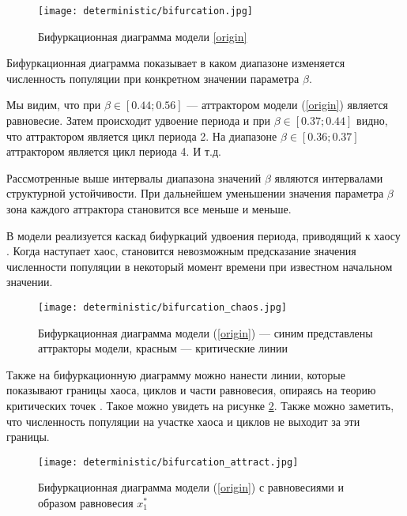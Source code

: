         \begin{figure}
            \centering
            \texttt{[image: deterministic/bifurcation.jpg]}

            \captionsetup{justification=centering}
            \caption{Бифуркационная диаграмма модели \ref{origin}}
            \label{bifurcation}
        \end{figure}

        Бифуркационная диаграмма показывает в каком диапазоне изменяется численность популяции при конкретном значении параметра \(\beta\).

        Мы видим, что при \(\beta \in [0.44; 0.56]\) --- аттрактором модели (\ref{origin}) является равновесие. Затем происходит удвоение периода и при \(\beta \in [0.37; 0.44]\) видно, что аттрактором является цикл периода 2. На диапазоне \(\beta \in [0.36; 0.37]\) аттрактором является цикл периода 4. И т.д.
        
        Рассмотренные выше интервалы диапазона значений \(\beta\) являются интервалами структурной устойчивости. При дальнейшем уменьшении значения параметра \(\beta\) зона каждого аттрактора становится все меньше и меньше. 
        
        В модели реализуется каскад бифуркаций удвоения периода, приводящий к хаосу \cite[стр. 33]{elementsOfNonlinearDynamic}. Когда наступает хаос, становится невозможным предсказание значения численности популяции в некоторый момент времени при известном начальном значении.
        
        \begin{figure}
            \centering
            \texttt{[image: deterministic/bifurcation\_chaos.jpg]}

            \captionsetup{justification=centering}
            \caption{Бифуркационная диаграмма модели (\ref{origin}) --- синим представлены аттракторы модели, красным --- критические линии }
            \label{bifurcation_chaos}
        \end{figure}
        
        Также на бифуркационную диаграмму можно нанести линии, которые показывают границы хаоса, циклов и части равновесия, опираясь на теорию критических точек \cite{nonsmoothOneDimensionalMapsSomeBasicConceptsAndDefinitions}. Такое можно увидеть на рисунке \ref{bifurcation_chaos}. Также можно заметить, что численность популяции на участке хаоса и циклов не выходит за эти границы.
        
        \begin{figure}
            \centering
            \texttt{[image: deterministic/bifurcation\_attract.jpg]}

            \captionsetup{justification=centering}
            \caption{Бифуркационная диаграмма модели (\ref{origin}) с равновесиями и образом равновесия \(x_1^*\) }
            \label{bifurcation_attractor}
        \end{figure}

